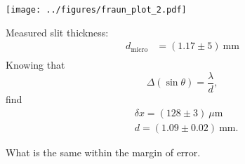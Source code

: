 
\begin{minipage}{0.48\textwidth}
        \hspace{-1cm}
        \texttt{[image: ../figures/fraun\_plot\_2.pdf]}
\end{minipage}
\hfill
\begin{minipage}{0.48\textwidth}
    Measured slit thickness:
    \begin{align*}
        d_{\text{micro}} &= (1.17 \pm 5) \ \text{mm} \\
    \end{align*}
    Knowing that
    \begin{equation*}
            \Delta (\sin \theta) = \frac{   \lambda}{   d},
    \end{equation*}
    find
    \begin{align*}
            &\delta x = (128 \pm 3) \ \mu\text{m} \\
            &\boxed{d = (1.09 \pm 0.02) \ \text{mm}}.
    \end{align*}
    

    What is the same within the margin of error.
\end{minipage}
